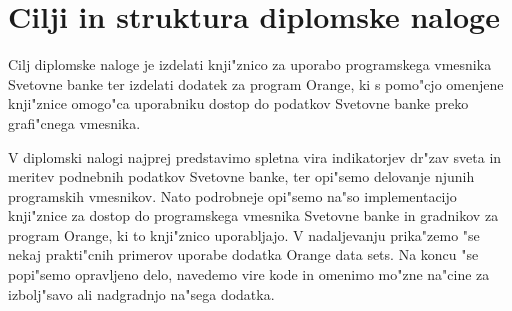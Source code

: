 \section{Cilji in struktura diplomske naloge}

Cilj diplomske naloge je izdelati knji"znico za uporabo programskega vmesnika
Svetovne banke ter izdelati dodatek za program Orange, ki s pomo"cjo omenjene
knji"znice omogo"ca uporabniku dostop do podatkov Svetovne banke preko
grafi"cnega vmesnika.

V diplomski nalogi najprej predstavimo spletna vira indikatorjev
dr"zav sveta in meritev podnebnih podatkov Svetovne banke, ter
opi"semo delovanje njunih programskih vmesnikov.
Nato podrobneje opi"semo na"so implementacijo knji"znice za dostop do
programskega vmesnika Svetovne banke in gradnikov za program Orange, ki to
knji"znico uporabljajo. V nadaljevanju prika"zemo "se nekaj prakti"cnih 
primerov uporabe dodatka Orange data sets. Na koncu "se popi"semo opravljeno 
delo, navedemo vire kode in omenimo mo"zne na"cine za izbolj"savo ali 
nadgradnjo na"sega dodatka.














